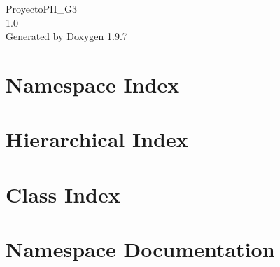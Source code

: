 \documentclass[twoside]{book}
\newcommand{\+}{\discretionary{\mbox{\scriptsize$\hookleftarrow$}}{}{}}
\newcommand{\clearemptydoublepage}{%
    \newpage{\pagestyle{empty}\cleardoublepage}%
  }
\begin{document}
  \raggedbottom
    \hypersetup{pageanchor=false,
                bookmarksnumbered=true,
                pdfencoding=unicode
               }
  \begin{titlepage}
  \vspace*{7cm}
  \begin{center}%
  {\Large Proyecto\+PII\+\_\+\+G3}\\
  [1ex]\large 1.\+0 \\
  \vspace*{1cm}
  {\large Generated by Doxygen 1.9.7}\\
  \end{center}
  \end{titlepage}
  \clearemptydoublepage
  \tableofcontents
  \clearemptydoublepage
  \hypersetup{pageanchor=true}

\chapter{Namespace Index}

\chapter{Hierarchical Index}

\chapter{Class Index}

\chapter{Namespace Documentation}










\end{document}
